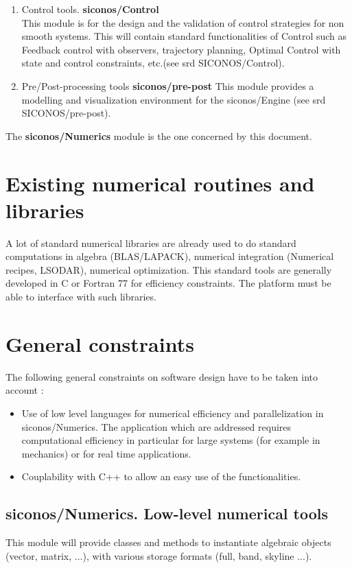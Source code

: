 \begin{enumerate}
\item Control tools. \textbf{\ac{siconos}/Control} \\
 This module is for the design and the validation of control strategies for non smooth systems. This will contain standard functionalities of Control such as Feedback control with observers, trajectory planning, Optimal Control with state and control constraints, etc.(see \ac{srd} SICONOS/Control).

\item Pre/Post-processing tools \textbf{\ac{siconos}/pre-post}
 This module provides a  modelling and visualization environment for the \ac{siconos}/Engine (see \ac{srd} SICONOS/pre-post).
\end{enumerate}

The \textbf{\ac{siconos}/Numerics} module is the one concerned by this document.



\section{Existing numerical routines and libraries}
A lot of standard numerical libraries are already used to do standard computations in algebra (BLAS/LAPACK), numerical integration (Numerical recipes, LSODAR), numerical optimization. This standard tools are generally developed in C or Fortran 77 for efficiency constraints. The platform must be able to interface with such libraries.



\section{General constraints}
The following general constraints on software design have to be taken into account :
\begin{itemize}
\item Use of low level languages for numerical efficiency and parallelization in \ac{siconos}/Numerics. The application which are addressed requires computational efficiency in particular for large systems (for example in mechanics) or for real time applications. 
\item Couplability with C++ to allow an easy use of the functionalities.
\end{itemize}



\subsection{\ac{siconos}/Numerics. Low-level numerical tools}
\label{Sec:SICONOS/Numerics}
This module will provide classes and methods to instantiate algebraic objects (vector, matrix, ...), 
with various storage formats (full, band, skyline ...). \\


